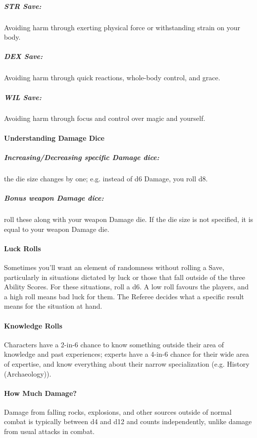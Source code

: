 \documentclass[itdr]{subfiles}
\begin{document}
\subparagraph{STR Save:} Avoiding harm through exerting physical force or withstanding strain on your body.

\subparagraph{DEX Save:} Avoiding harm through quick reactions, whole-body control, and grace.

\subparagraph{WIL Save:} Avoiding harm through focus and control over magic and yourself.

\vfill
\break

\paragraph{Understanding Damage Dice}
\subparagraph{Increasing/Decreasing specific Damage dice:} the die size changes by one; e.g. instead of d6 Damage, you roll d8.

\subparagraph{Bonus weapon Damage dice:} roll these along with your weapon Damage die. If the die size is not \mbox{specified}, it is equal to your weapon Damage die.

\paragraph{Luck Rolls}
Sometimes you'll want an element of randomness without rolling a Save, particularly in situations dictated by luck or those that fall outside of the three Ability Scores. For these situations, roll a d6. A low roll favours the players, and a high roll means bad luck for them. The Referee decides what a specific result means for the situation at hand.

\paragraph{Knowledge Rolls}
Characters have a 2-in-6 chance to know something outside their area of knowledge and past experiences; experts have a 4-in-6 chance for their wide area of expertise, and know everything about their narrow specialization (e.g. History (Archaeology)).

\paragraph{How Much Damage?}
Damage from falling rocks, explosions, and other sources outside of normal combat is typically between d4 and d12 and counts independently, unlike damage from usual attacks in combat.
\end{document}
